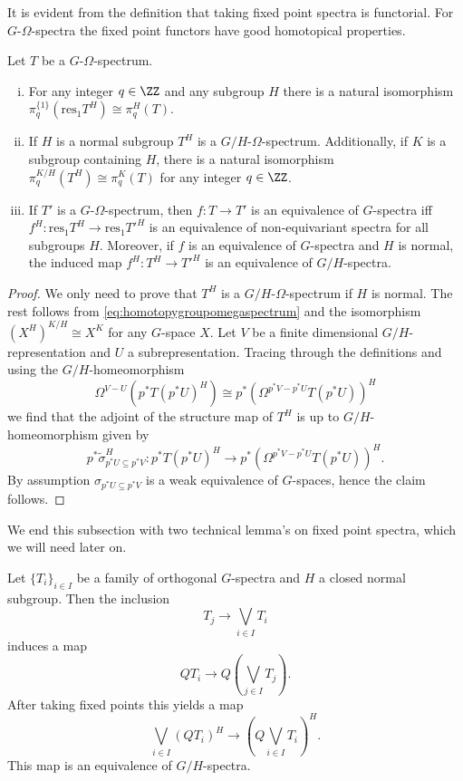 It is evident from the definition that taking fixed point spectra is functorial.
For $G$-$\Omega$-spectra the fixed point functors have good homotopical
properties.
\begin{lem}\label{lem:omegaspectrafixedpoints}
Let $T$ be a $G$-$\Omega$-spectrum.
\begin{enumerate}[(i)]
\item For any integer $q\in \ZZ$ and any subgroup $H$ there is a natural isomorphism $\pi_q^{\{1\}}(\mathrm{res}_1 T^H)\cong \pi_q^H(T)$.
\item  If $H$ is a normal subgroup $T^H$ is a $G/H$-$\Omega$-spectrum. Additionally,
if $K$ is a subgroup containing $H$, there is a natural isomorphism
$\pi_q^{K/H}(T^H)\cong \pi_q^K(T)$ for any integer $q\in \ZZ$.
\item If $T'$ is a $G$-$\Omega$-spectrum, then $f:T\to T'$ is an equivalence of $G$-spectra
iff $f^H: \mathrm{res}_1 T^H\to \mathrm{res}_1 T'^H$ is an equivalence of non-equivariant spectra
for all subgroups $H$. Moreover, if $f$ is an equivalence of $G$-spectra and $H$ is normal, the induced
map $f^H:T^H\to T'^H$ is an equivalence of $G/H$-spectra.
\end{enumerate}
\end{lem}

\begin{proof}
We only need to prove that $T^H$ is a $G/H$-$\Omega$-spectrum if $H$ is normal. The rest follows
from \eqref{eq:homotopygroupomegaspectrum} and the isomorphism 
$
(X^H)^{K/H}\cong X^K
$
for any $G$-space $X$. Let $V$ be a finite dimensional $G/H$-representation and $U$ a subrepresentation.
Tracing through the definitions and using the $G/H$-homeomorphism 
\[
\Omega^{V-U}(p^\ast T(p^\ast U)^H)\cong p^\ast(\Omega^{p^\ast V-p^\ast U}T(p^\ast U))^H
\]
we find that the adjoint of the structure map of $T^H$ is up to $G/H$-homeomorphism
given by
\[
p^\ast \tilde \sigma_{p^\ast U\subseteq p^\ast V}^H:p^\ast T(p^\ast U)^H \to 
p^\ast(\Omega^{p^\ast V-p^\ast U}T(p^\ast U))^H.
\]
By assumption $\sigma_{p^\ast U\subseteq p^\ast V}$ is a weak equivalence of $G$-spaces,
hence the claim follows.
\end{proof}

We end this subsection with two technical lemma's on fixed point spectra, which we will need later on.

\begin{lem}\label{lem:wedgefixed}
Let $\{T_i\}_{i\in I}$ be a family of  orthogonal $G$-spectra and $H$ a closed normal subgroup. Then the inclusion
$$T_j\rightarrow \bigvee_{i\in I } T_i$$ induces a map
$$QT_i\rightarrow Q\left(\bigvee_{j \in I } T_j\right).$$ After taking fixed points
this yields a map 
$$\bigvee_{i\in I}(QT_i)^H\rightarrow \left(Q\bigvee_{i \in I } T_i\right)^H.$$
This map is an equivalence of $G/H$-spectra.
\end{lem}


